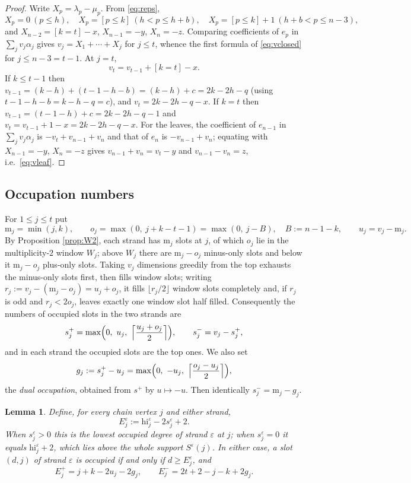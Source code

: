 \documentclass[reqno]{amsart}
\theoremstyle{plain}
\newtheorem{lemma}[theorem]{Lemma}
\theoremstyle{definition}
\newcommand{\la}{\lambda}
\newcommand{\al}{\alpha}
\newcommand{\eps}{\varepsilon}
\newcommand{\hi}{\mathrm{hi}}
\newcommand{\ms}{\mathrm{m}}
\begin{document}
\begin{proof}
Write $X_p=\la_p-\mu_p$.  From \eqref{eq:reps},
\[
   X_p=0\ (p\le h),\quad X_p=[p\le k]\ (h<p\le h+b),\quad
   X_p=[p\le k]+1\ (h+b<p\le n-3),
\]
and $X_{n-2}=[k=t]-x$, $X_{n-1}=-y$, $X_n=-z$.  Comparing coefficients of
$e_p$ in $\sum_jv_j\al_j$ gives $v_j=X_1+\cdots+X_j$ for $j\le t$, whence the
first formula of \eqref{eq:vclosed} for $j\le n-3=t-1$.  At $j=t$,
\[
   v_t=v_{t-1}+[k=t]-x .
\]
If $k\le t-1$ then $v_{t-1}=(k-h)+(t-1-h-b)=(k-h)+c=2k-2h-q$ (using
$t-1-h-b=k-h-q=c$), and $v_t=2k-2h-q-x$.  If $k=t$ then
$v_{t-1}=(t-1-h)+c=2k-2h-q-1$ and $v_t=v_{t-1}+1-x=2k-2h-q-x$.  For the leaves,
the coefficient of $e_{n-1}$ in $\sum_jv_j\al_j$ is $-v_t+v_{n-1}+v_n$ and that
of $e_n$ is $-v_{n-1}+v_n$; equating with $X_{n-1}=-y$, $X_n=-z$ gives
$v_{n-1}+v_n=v_t-y$ and $v_{n-1}-v_n=z$, i.e.\ \eqref{eq:vleaf}.
\end{proof}

\subsection{Occupation numbers}
For $1\le j\le t$ put
\[
   \ms_j=\min(j,k),\qquad o_j=\max(0,\ j+k-t-1)=\max(0,\ j-B),\quad B:=n-1-k,
   \qquad u_j=v_j-\ms_j .
\]
By Proposition \ref{prop:W2}, each strand has $\ms_j$ slots at $j$, of which
$o_j$ lie in the multiplicity-$2$ window $W_j$; above $W_j$ there are
$\ms_j-o_j$ minus-only slots and below it $\ms_j-o_j$ plus-only slots.  Taking
$v_j$ dimensions greedily from the top exhausts the minus-only slots first,
then fills window slots; writing $r_j:=v_j-(\ms_j-o_j)=u_j+o_j$, it fills
$\lfloor r_j/2\rfloor$ window slots completely and, if $r_j$ is odd and
$r_j<2o_j$, leaves exactly one window slot half filled.  Consequently the
numbers of occupied slots in the two strands are
\begin{equation}\label{eq:sform}
   s^{+}_j=\max\Bigl(0,\ u_j,\ \Bigl\lceil\frac{u_j+o_j}{2}\Bigr\rceil\Bigr),
   \qquad
   s^{-}_j=v_j-s^{+}_j ,
\end{equation}
and in each strand the occupied slots are the top ones.  We also set
\begin{equation}\label{eq:g}
   g_j:=s^{+}_j-u_j
   =\max\Bigl(0,\ -u_j,\ \Bigl\lceil\frac{o_j-u_j}{2}\Bigr\rceil\Bigr),
\end{equation}
the \emph{dual occupation}, obtained from $s^+$ by $u\mapsto-u$.  Then
identically $s^{-}_j=\ms_j-g_j$.

\begin{lemma}\label{lem:Deps}
Define, for every chain vertex $j$ and either strand,
\[
   E^{\eps}_j:=\hi^{\eps}_j-2s^{\eps}_j+2 .
\]
When $s^{\eps}_j>0$ this is the lowest occupied degree of strand $\eps$ at
$j$; when $s^{\eps}_j=0$ it equals $\hi^{\eps}_j+2$, which lies above the
whole support $S^{\eps}(j)$.  \emph{In either case, a slot $(d,j)$ of strand
$\eps$ is occupied if and only if $d\ge E^{\eps}_j$}, and
\[
   E^{+}_j=j+k-2u_j-2g_j,\qquad E^{-}_j=2t+2-j-k+2g_j .
\]
\end{lemma}
\end{document}
